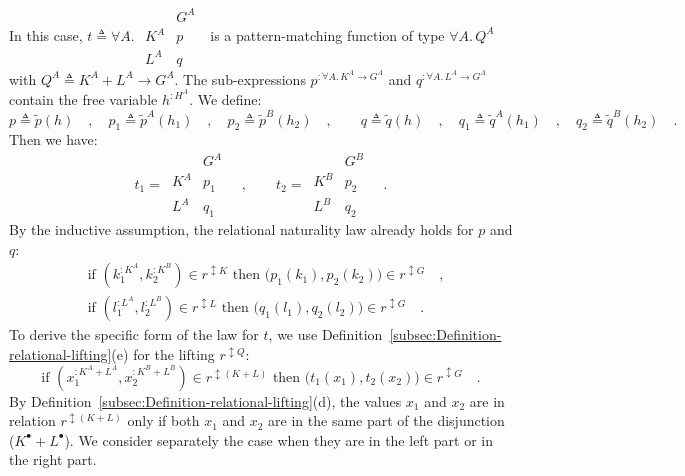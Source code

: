 In this case, $t\triangleq\forall A.\,\,\begin{array}{|c||c|}
 & G^{A}\\
\hline K^{A} & p\\
L^{A} & q
\end{array}\,\,$ is a pattern-matching function of type $\forall A.\,Q^{A}$ with
$Q^{A}\triangleq K^{A}+L^{A}\rightarrow G^{A}$. The sub-expressions
$p^{:\forall A.\,K^{A}\rightarrow G^{A}}$ and $q^{:\forall A.\,L^{A}\rightarrow G^{A}}$
contain the free variable $h^{:H^{A}}$. We define:
\[
p\triangleq\tilde{p}(h)\quad,\quad p_{1}\triangleq\tilde{p}^{A}(h_{1})\quad,\quad p_{2}\triangleq\tilde{p}^{B}(h_{2})\quad,\quad\quad q\triangleq\tilde{q}(h)\quad,\quad q_{1}\triangleq\tilde{q}^{A}(h_{1})\quad,\quad q_{2}\triangleq\tilde{q}^{B}(h_{2})\quad.
\]
Then we have:
\[
t_{1}=\,\begin{array}{|c||c|}
 & G^{A}\\
\hline K^{A} & p_{1}\\
L^{A} & q_{1}
\end{array}\quad,\quad\quad t_{2}=\,\begin{array}{|c||c|}
 & G^{B}\\
\hline K^{B} & p_{2}\\
L^{B} & q_{2}
\end{array}\quad.
\]
By the inductive assumption, the relational naturality law already
holds for $p$ and $q$:
\begin{align*}
 & \text{if }(k_{1}^{:K^{A}},k_{2}^{:K^{B}})\in r^{\updownarrow K}\text{ then }\big(p_{1}(k_{1}),p_{2}(k_{2})\big)\in r^{\updownarrow G}\quad,\\
 & \text{if }(l_{1}^{:L^{A}},l_{2}^{:L^{B}})\in r^{\updownarrow L}\text{ then }\big(q_{1}(l_{1}),q_{2}(l_{2})\big)\in r^{\updownarrow G}\quad.
\end{align*}
To derive the specific form of the law for $t$, we use Definition~\ref{subsec:Definition-relational-lifting}(e)
for the lifting $r^{\updownarrow Q}$:
\[
\text{if }(x_{1}^{:K^{A}+L^{A}},x_{2}^{:K^{B}+L^{B}})\in r^{\updownarrow(K+L)}\text{ then }\big(t_{1}(x_{1}),t_{2}(x_{2})\big)\in r^{\updownarrow G}\quad.
\]
By Definition~\ref{subsec:Definition-relational-lifting}(d), the
values $x_{1}$ and $x_{2}$ are in relation $r^{\updownarrow(K+L)}$
only if both $x_{1}$ and $x_{2}$ are in the same part of the disjunction
($K^{\bullet}+L^{\bullet}$). We consider separately the case when
they are in the left part or in the right part.

